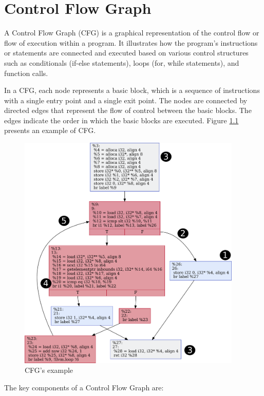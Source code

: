 \chapter{Control Flow Graph}
\label{ch:cfg}

A Control Flow Graph (CFG) is a graphical representation of the control flow or flow of execution within a program. It illustrates how the program's instructions or statements are connected and executed based on various control structures such as conditionals (if-else statements), loops (for, while statements), and function calls.

In a CFG, each node represents a basic block, which is a sequence of instructions with a single entry point and a single exit point. The nodes are connected by directed edges that represent the flow of control between the basic blocks. The edges indicate the order in which the basic blocks are executed. Figure \ref{fig:cfg_numbers} presents an example of CFG.

\begin{figure}[!ht]
    \centering
    \includegraphics[width=0.95\textwidth]{images/cfg_numbers.pdf}
    \caption{CFG's example}
    \label{fig:cfg_numbers}
\end{figure}

The key components of a Control Flow Graph are: 

